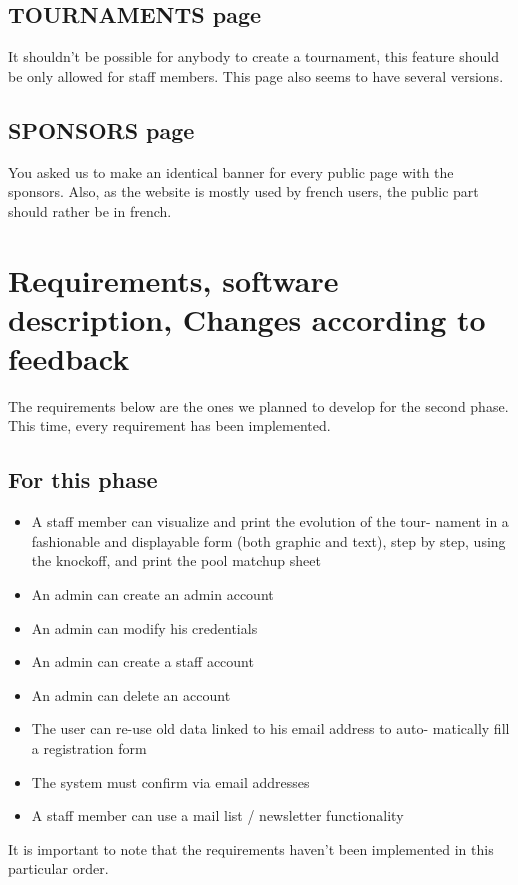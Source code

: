 \documentclass[a4paper, 12pt]{article}
\begin{document}
\subsection*{TOURNAMENTS page}
It shouldn't be possible for anybody to create a tournament, this feature should be only allowed for staff members. This page also seems to have several versions.

\subsection*{SPONSORS page}

You asked us to make an identical banner for every public page with the sponsors. Also, as the website is mostly used by french users, the public part should rather be in french.

 
\section{Requirements, software description, Changes according to feedback}

The requirements below are the ones we planned to develop for the second phase. This time, every requirement has been implemented. \\
\subsection{For this phase}
	
\begin{itemize}
 
\item A staff member can visualize and print the evolution of the tour- nament in a fashionable and displayable form (both graphic and text), step by step, using the knockoff, and print the pool matchup sheet
\item An admin can create an admin account
\item An admin can modify his credentials
\item An admin can create a staff account
\item An admin can delete an account
\item The user can re-use old data linked to his email address to auto- matically fill a registration form
\item The system must confirm via email addresses
\item A staff member can use a mail list / newsletter functionality
\\
\end{itemize}
It is important to note that the requirements haven't been implemented in this particular order.\\
\end{document}
